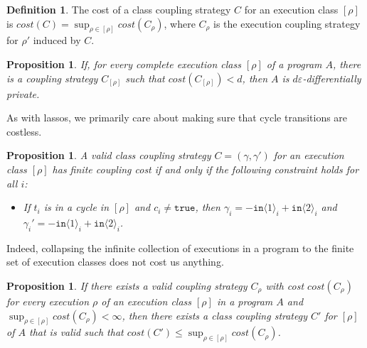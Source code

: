 \documentclass[12pt]{article}
\newcommand{\brangle}[1]{\langle #1 \rangle}
\newtheorem{prop}[thm]{Proposition}
\theoremstyle{definition}
\newtheorem{defn}[thm]{Definition}
\begin{document}
\begin{defn}
    The cost of a class coupling strategy $C$ for an execution class $[\rho]$ is $cost(C) = \sup_{\rho\in [\rho]}cost(C_{\rho})$, where $C_{\rho}$ is the execution coupling strategy for $\rho'$ induced by $C$.
\end{defn}

\begin{prop}
    If, for every complete execution class $[\rho]$ of a program $A$, there is a coupling strategy $C_{[\rho]}$ such that $cost(C_{[\rho]})<d$, then $A$ is $d\varepsilon$-differentially private.
\end{prop}

As with lassos, we primarily care about making sure that cycle transitions are costless. 

\begin{prop}
    A valid class coupling strategy $C=(\gamma, \gamma')$ for an execution class $[\rho]$ has finite coupling cost if and only if the following constraint holds for all $i$: 
    \begin{itemize}
        \item If $t_i$ is in a cycle in $[\rho]$ and $c_i\neq\texttt{true}$, then $\gamma_i = -\texttt{in}\brangle{1}_i+\texttt{in}\brangle{2}_i$ and $\gamma_i' = -\texttt{in}\brangle{1}_i+\texttt{in}\brangle{2}_i$.
    \end{itemize}
\end{prop}


Indeed, collapsing the infinite collection of executions in a program to the finite set of execution classes does not cost us anything. 

\begin{prop}
    If there exists a valid coupling strategy $C_\rho$ with cost $cost(C_\rho)$ for every execution $\rho$ of an execution class $[\rho]$ in a program $A$ and $\sup_{\rho\in [\rho]}cost(C_\rho)< \infty$, then there exists a class coupling strategy $C'$ for $[\rho]$ of $A$ that is valid such that $cost(C') \leq \sup_{\rho\in [\rho]}cost(C_\rho)$. 
\end{prop}
\end{document}
